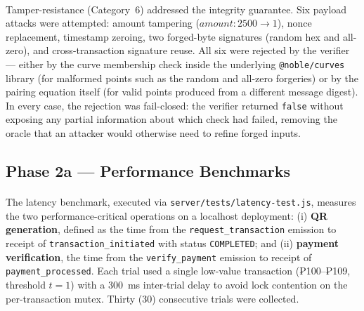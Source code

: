 \paragraph{}Tamper-resistance (Category~6) addressed the integrity guarantee. Six payload attacks were attempted: amount tampering ($\textit{amount}: 2500 \to 1$), nonce replacement, timestamp zeroing, two forged-byte signatures (random hex and all-zero), and cross-transaction signature reuse. All six were rejected by the verifier --- either by the curve membership check inside the underlying \texttt{@noble/curves} library (for malformed points such as the random and all-zero forgeries) or by the pairing equation itself (for valid points produced from a different message digest). In every case, the rejection was fail-closed: the verifier returned \texttt{false} without exposing any partial information about which check had failed, removing the oracle that an attacker would otherwise need to refine forged inputs.

\subsection{Phase 2a --- Performance Benchmarks}
\label{sect:results_perf}

\paragraph{}The latency benchmark, executed via \texttt{server/tests/latency-test.js}, measures the two performance-critical operations on a localhost deployment: (i) \textbf{QR generation}, defined as the time from the \texttt{request\_transaction} emission to receipt of \texttt{transaction\_initiated} with status \texttt{COMPLETED}; and (ii) \textbf{payment verification}, the time from the \texttt{verify\_payment} emission to receipt of \texttt{payment\_processed}. Each trial used a single low-value transaction (₱100--₱109, threshold $t = 1$) with a 300~ms inter-trial delay to avoid lock contention on the per-transaction mutex. Thirty (30) consecutive trials were collected.

